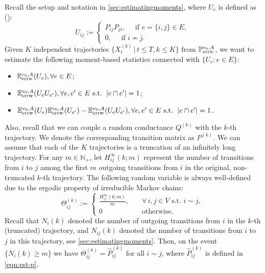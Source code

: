 \documentclass[a4paper, 11pt]{article}
\renewcommand{\P}{\mathbb{P}}
\newcommand{\E}{\mathbb{E}}
\newcommand{\Eerrw}{\E_{\textnormal{errw}}}
\newcommand{\Perrw}{\P_{\textnormal{errw}}}
\newcommand{\blue}{\color{blue}}
\newcommand{\black}{\color{black}}
\begin{document}
Recall the setup and notation in \cref{sec:estimatingmoments}, where $U_e$ is defined as ():
\begin{equation*}
U_{ij} :=
\begin{cases} 
 P_{ij}P_{ji}, \quad \text{ if } e =\{i,j\} \in E,\\
 0, \quad \text{ if } i \nsim j.
\end{cases}
\end{equation*}
Given $K$ independent trajectories $\{X_t^{(k)}\,|\,t\leq T, k\leq K\}$ from $\Perrw^{v_0, A}$, we want to estimate the following moment-based statistics connected with $\{U_e:e\in E\}$: 
\begin{itemize}
\item[i.] $\Eerrw^{v_0,A}(U_e), \forall e\in E$;
\item[ii.] $\Eerrw^{v_0,A}(U_e U_{e'}), \forall e,e'\in E\text{ s.t. }\,|e\cap e'|=1$;
\item[iii.] $\Eerrw^{v_0,A}(U_e)\Eerrw^{v_0,A}(U_{e'})-\Eerrw^{v_0,A}(U_eU_{e'}), \forall e,e'\in E\text{ s.t. }\,|e\cap e'|=1$.
\end{itemize}
Also, recall that we can couple a random conductance $Q^{(k)}$ with the $k$-th trajectory. We denote the corresponding transition matrix as $P^{(k)}$. 
We can assume that each of the $K$ trajectories is a truncation of an infinitely long trajectory. For any \(m \in \mathbb{N}_+\), let \(H_{ij}^\infty(k; m)\) represent the number of transitions from $i$ to $j$ among the first \(m\) outgoing transitions from \(i\) in the original, non-truncated \(k\)-th trajectory. The following random variable is always well-defined due to the ergodic property of irreducible Markov chains: 
\begin{equation}
\label{eqn:errw-est-theta}
\Theta_{ij}^{(k)}:= \begin{cases}
    \frac{H_{ij}^\infty(k; m)}{m}, & \quad\forall \, i, j\in V\text{ s.t. }i\sim j,\\
    0 & \quad \text{otherwise}.
    \end{cases}
\end{equation}
Recall that $N_i(k)$ denoted the number of outgoing transitions from $i$ in the $k$-th (truncated) trajectory,
and $N_{ij}(k)$ denoted the number of transitions from $i$ to $j$ in this trajectory, see 
\cref{sec:estimatingmoments}.
Then, on the event $\{N_i(k)\geq m\}$ we have $\Theta_{ij}^{(k)} = \hat{P}_{ij}^{(k)}$ for all $i \sim j$, where $\hat{P}_{ij}^{(k)}$ is defined in
\cref{eqn:est-p}.
\end{document}

